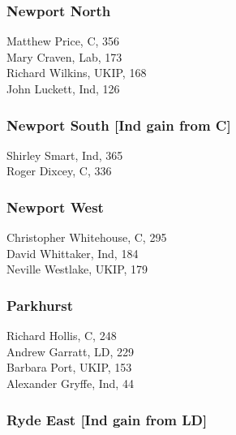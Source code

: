 \documentclass[a4paper,openany,10pt]{book}
\begin{document}
\subsubsection*{Newport North}



Matthew Price, C, 356\\
Mary Craven, Lab, 173\\
Richard Wilkins, UKIP, 168\\
John Luckett, Ind, 126\\


\subsubsection*{Newport South \hspace*{\fill}\nolinebreak[1]%
\enspace\hspace*{\fill}
[Ind gain from C]}



Shirley Smart, Ind, 365\\
Roger Dixcey, C, 336\\


\subsubsection*{Newport West}



Christopher Whitehouse, C, 295\\
David Whittaker, Ind, 184\\
Neville Westlake, UKIP, 179\\


\subsubsection*{Parkhurst}



Richard Hollis, C, 248\\
Andrew Garratt, LD, 229\\
Barbara Port, UKIP, 153\\
Alexander Gryffe, Ind, 44\\


\subsubsection*{Ryde East \hspace*{\fill}\nolinebreak[1]%
\enspace\hspace*{\fill}
[Ind gain from LD]}
\end{document}
